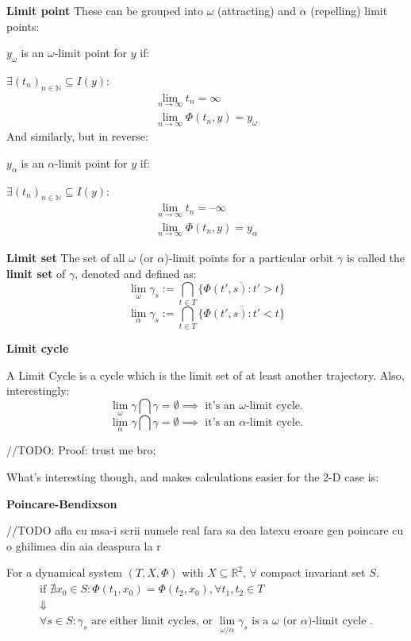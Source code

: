 \begin{definition}\textbf{Limit point}
  These can be grouped into $\omega$ (attracting) and $\alpha$ (repelling) limit points:

  $y_\omega$ is an $\omega$-limit point  for $y$ if:

  $\exists (t_n)_{n \in \mathbb{N}} \subseteq I(y) : $
  \begin{gather*}
    \lim_{n \rightarrow \infty} t_n = \infty  \\
    \lim_{n \rightarrow \infty} \Phi(t_n,y) = y_\omega
  \end{gather*}
  And similarly, but in reverse:

  $y_\alpha$ is an $\alpha$-limit point  for $y$ if:

  $\exists (t_n)_{n \in \mathbb{N}} \subseteq I(y) : $
  \begin{gather*}
    \lim_{n \rightarrow \infty} t_n = \textbf{--} \infty  \\
    \lim_{n \rightarrow \infty} \Phi(t_n,y) = y_\alpha
  \end{gather*}
\end{definition}

\begin{definition}\textbf{Limit set}
  The set of all $\omega$ (or $\alpha$)-limit points for a particular orbit $\gamma$ is called the \textbf{limit set} of $\gamma$, denoted and defined as:
  \[
    \lim_{\omega}\gamma_s := \bigcap_{t \in T} \overline{ \{ \Phi(t', s) : t' > t \} }
  \]
  \[
    \lim_{\alpha}\gamma_s := \bigcap_{t \in T} \overline{ \{ \Phi(t', s) : t' < t \} }
  \]
\end{definition}

\begin{definition} \textbf{Limit cycle}

  A Limit Cycle is a cycle which is the limit set of at least another trajectory.
  Also, interestingly:
  \[
    \lim_{\omega}\gamma \bigcap \gamma  = \emptyset \implies \text{ it's an } \omega \text{-limit cycle}.
  \]
  \[
    \lim_{\alpha}\gamma \bigcap \gamma  = \emptyset \implies \text{ it's an } \alpha \text{-limit cycle}.
  \]
\end{definition}

//TODO: Proof: trust me bro;

What's interesting though, and makes calculations easier for the 2-D case is:
\begin{theorem}  \textbf{Poincare-Bendixson}

  //TODO afla cu msa-i scrii numele real fara sa dea latexu eroare gen poincare cu o ghilimea din aia deaspura la r

  For a dynamical system $(T,X,\Phi)$ with $X \subseteq \mathbb{R}^2$, $\forall$ compact invariant set $S$.
  \begin{gather*}
    \text{if } \nexists x_0 \in S : \Phi(t_1, x_0) = \Phi(t_2,x_0), \forall t_1,t_2 \in T \\
    \Downarrow \\
    \forall s \in S: \gamma_s \text{ are either limit cycles, or } \lim_{\omega / \alpha}\gamma_s \text{ is a $\omega$ (or $\alpha$)-limit cycle }.
  \end{gather*}
\end{theorem}

